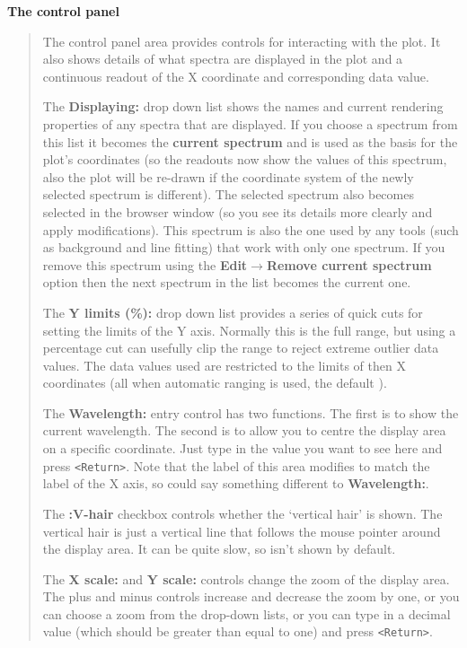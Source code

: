 \documentclass[twoside,11pt]{article}
\newcommand{\latexhtml}[2]{#1}
\renewcommand{\_}{\texttt{\symbol{95}}}
\newcommand{\submenuitem}[2]{\latexhtml{\textbf{#1$\rightarrow$#2}}{\textbf{#1->#2}}}
\newcommand{\labelitem}[1]{\textbf{#1}}
\newcommand{\hitext}[1]{\texttt{#1}}
\newcommand{\subheading}[1]{\textbf{\large{#1}}}
\begin{document}
\subheading{The control panel}
\begin{quote}
 The control panel area provides controls for interacting with the
 plot. It also shows details of what spectra are displayed in the plot
 and a continuous readout of the X coordinate and corresponding data
 value.

 The \labelitem{Displaying:} drop down list shows the names and current
 rendering properties of any spectra that are displayed. If you choose a
 spectrum from this list it becomes the \labelitem{current spectrum} and is
 used as the basis for the plot's coordinates (so the readouts now show the
 values of this spectrum, also the plot will be re-drawn if the coordinate
 system of the newly selected spectrum is different). The selected spectrum
 also becomes selected in the browser window (so you see its details more
 clearly and apply modifications). This spectrum is also the one used by any
 tools (such as background and line fitting) that work with only one
 spectrum. If you remove this spectrum using the \submenuitem{Edit}{Remove
 current spectrum} option then the next spectrum in the list becomes the
 current one.

 The \labelitem{Y limits (\%):} drop down list provides a series of
 quick cuts for setting the limits of the Y axis. Normally this is the
 full range, but using a percentage cut can usefully clip the range to
 reject extreme outlier data values. The data values used are restricted
 to the limits of then X coordinates (all when automatic ranging is used, 
 the default ).

 The \labelitem{Wavelength:} entry control has two functions. The
 first is to show the current wavelength. The second is to allow you
 to centre the display area on a specific coordinate. Just type in the
 value you want to see here and press \hitext{<Return>}. Note that the
 label of this area modifies to match the label of the X axis, so
 could say something different to \labelitem{Wavelength:}.

 The \labelitem{:V-hair} checkbox controls whether the `vertical hair'
 is shown. The vertical hair is just a vertical line that follows the
 mouse pointer around the display area. It can be quite slow, so isn't
 shown by default.

 The \labelitem{X scale:} and \labelitem{Y scale:} controls change the
 zoom of the display area. The plus and minus controls increase and
 decrease the zoom by one, or you can choose a zoom from the drop-down
 lists, or you can type in a decimal value (which should be greater
 than equal to one) and press \hitext{<Return>}.


\end{quote}
\end{document}
